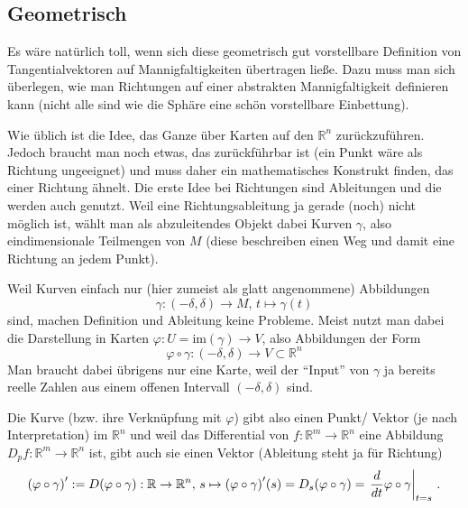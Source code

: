 \documentclass[../H_Analysis_main.tex]{subfiles}
\begin{document}
		\subsection{Geometrisch}
Es wäre natürlich toll, wenn sich diese geometrisch gut vorstellbare Definition von Tangentialvektoren auf Mannigfaltigkeiten übertragen ließe. Dazu muss man sich überlegen, wie man Richtungen auf einer abstrakten Mannigfaltigkeit definieren kann (nicht alle sind wie die Sphäre eine  schön vorstellbare Einbettung). 

Wie üblich ist die Idee, das Ganze über Karten auf den $\mathbb{R}^n$ zurückzuführen. Jedoch braucht man noch etwas, das zurückführbar ist (ein Punkt wäre als Richtung ungeeignet) und muss daher ein mathematisches Konstrukt finden, das einer Richtung ähnelt. Die erste Idee bei Richtungen sind Ableitungen und die werden auch genutzt. Weil eine Richtungsableitung ja gerade (noch) nicht möglich ist, wählt man als abzuleitendes Objekt dabei Kurven $\gamma$, also eindimensionale Teilmengen von $M$ (diese beschreiben einen Weg und damit eine Richtung an jedem Punkt).

Weil Kurven einfach nur (hier zumeist als glatt angenommene) Abbildungen
\begin{equation}
\gamma: (-\delta, \delta) \rightarrow M, \, t \mapsto \gamma(t)
\end{equation}
sind, machen Definition und Ableitung keine Probleme. Meist nutzt man dabei die Darstellung in Karten $\varphi: U = \text{im}(\gamma) \rightarrow V$, also Abbildungen der Form
\begin{equation}
\varphi \circ \gamma: (-\delta, \delta) \rightarrow V \subset \mathbb{R}^n
\end{equation}
Man braucht dabei übrigens nur eine Karte, weil der \enquote{Input} von $\gamma$ ja bereits reelle Zahlen aus einem offenen Intervall $(-\delta, \delta)$ sind.


Die Kurve (bzw. ihre Verknüpfung mit $\varphi$) gibt also einen Punkt/ Vektor (je nach Interpretation) im $\mathbb{R}^n$ und weil das Differential von $f: \mathbb{R}^m \rightarrow \mathbb{R}^n$ eine Abbildung $D_p f: \mathbb{R}^m \rightarrow \mathbb{R}^n$ ist, gibt auch sie einen Vektor (Ableitung steht ja für Richtung)
\begin{equation}
\qty(\varphi \circ \gamma)' := D\qty(\varphi \circ \gamma): \mathbb{R} \rightarrow \mathbb{R}^n, \, s \mapsto \qty(\varphi \circ \gamma)'(s) = D_s \qty(\varphi \circ \gamma) = \eval{\dv{t} \varphi \circ \gamma}_{t = s} \, .
\end{equation}
\end{document}
